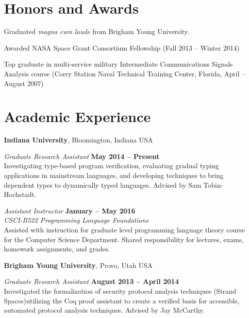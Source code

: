 \documentclass[margin,line]{res}
\begin{document}
\begin{resume}
\section{\sc Honors and Awards} 
Graduated \emph{magna cum laude} from Brigham Young University.

Awarded NASA Space Grant Consortium Fellowship (Fall 2013 -- Winter
2014)

Top graduate in multi-service military Intermediate Communications
Signals Analysis course (Corry Station Naval Technical Training
Center, Florida, April -- August 2007)

%

\section{\sc Academic Experience}
{\bf Indiana University}, Bloomington, Indiana USA

\vspace{-.3cm}
{\em Graduate Research Assistant} \hfill {\bf May 2014 -- Present}\\
Investigating type-based program verification, evaluating gradual
typing applications in mainstream languages, and developing techniques
to bring dependent types to dynamically typed languages. Advised by
Sam Tobin-Hochstadt.


{\em Assistant Instructor} \hfill {\bf January -- May 2016}\\
{\em CSCI-B522 Programming Language Foundations}\\
Assisted with instruction for graduate level programming language
theory course for the Computer Science Department.  Shared
responsibility for lectures, exams, homework assignments, and grades.

{\bf Brigham Young University}, Provo, Utah USA

\vspace{-.3cm}

{\em Graduate Research Assistant} \hfill {\bf August 2013 -- April 2014}\\
Investigated the formalization of security protocol analysis techniques
(Strand Spaces)utilizing the Coq proof assistant to create a verified
basis for accessible, automated protocol analysis techniques. Advised
by Jay McCarthy.


\end{resume}
\end{document}
